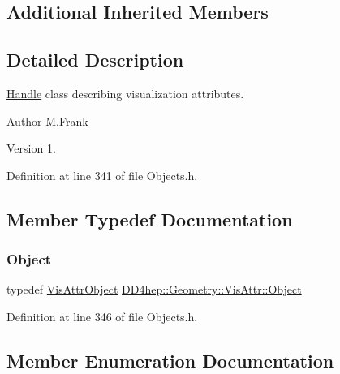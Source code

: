 \subsection*{Additional Inherited Members}


\subsection{Detailed Description}
\hyperlink{class_d_d4hep_1_1_handle}{Handle} class describing visualization attributes. 

\begin{DoxyAuthor}{Author}
M.\+Frank 
\end{DoxyAuthor}
\begin{DoxyVersion}{Version}
1. 
\end{DoxyVersion}


Definition at line 341 of file Objects.\+h.



\subsection{Member Typedef Documentation}
\hypertarget{class_d_d4hep_1_1_geometry_1_1_vis_attr_a8c2a1708a4161f27aed36d464be316cc}{}\label{class_d_d4hep_1_1_geometry_1_1_vis_attr_a8c2a1708a4161f27aed36d464be316cc} 
\subsubsection{\texorpdfstring{Object}{Object}}
{\footnotesize\ttfamily typedef \hyperlink{class_d_d4hep_1_1_geometry_1_1_vis_attr_object}{Vis\+Attr\+Object} \hyperlink{class_d_d4hep_1_1_geometry_1_1_vis_attr_a8c2a1708a4161f27aed36d464be316cc}{D\+D4hep\+::\+Geometry\+::\+Vis\+Attr\+::\+Object}}



Definition at line 346 of file Objects.\+h.



\subsection{Member Enumeration Documentation}
\hypertarget{class_d_d4hep_1_1_geometry_1_1_vis_attr_a6b393ca7e14c69cf689ce7274f8a7630}{}\label{class_d_d4hep_1_1_geometry_1_1_vis_attr_a6b393ca7e14c69cf689ce7274f8a7630} 
